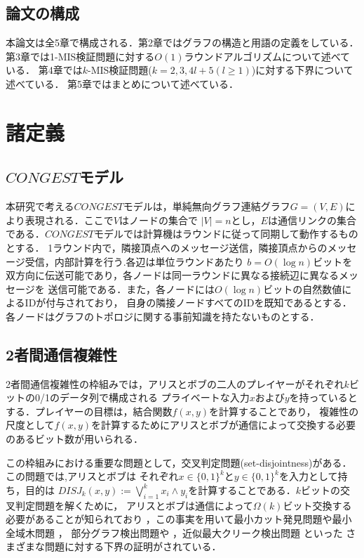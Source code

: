 \documentclass[12pt]{thesis}
\theoremstyle{definition}
\begin{document}
\section{論文の構成}
本論文は全5章で構成される．第2章ではグラフの構造と用語の定義をしている．
第3章では1-MIS検証問題に対する$O(1)$ラウンドアルゴリズムについて述べている．
第4章では$k$-MIS検証問題($k = 2, 3, 4l + 5 ( l \geq 1)$)に対する下界について述べている．
第5章ではまとめについて述べている．

\chapter{諸定義}

\section{$CONGEST$モデル}
本研究で考える$CONGEST$モデルは，単純無向グラフ連結グラフ$G = (V, E)$により表現される．ここで$V$はノードの集合で
$|V| = n$とし，$E$は通信リンクの集合である．$CONGEST$モデルでは計算機はラウンドに従って同期して動作するものとする．
1ラウンド内で，隣接頂点へのメッセージ送信，隣接頂点からのメッセージ受信，内部計算を行う.各辺は単位ラウンドあたり
$b = O(\log n)$ビットを双方向に伝送可能であり，各ノードは同一ラウンドに異なる接続辺に異なるメッセージを
送信可能である．また，各ノードには$O(\log n)$ビットの自然数値によるIDが付与されており，
自身の隣接ノードすべてのIDを既知であるとする．各ノードはグラフのトポロジに関する事前知識を持たないものとする．

\section{2者間通信複雑性}
2者間通信複雑性の枠組みでは，アリスとボブの二人のプレイヤーがそれぞれ$k$ビットの0/1のデータ列で構成される
プライベートな入力$x$および$y$を持っているとする．プレイヤーの目標は，結合関数$f(x, y)$を計算することであり，
複雑性の尺度として$f(x, y)$を計算するためにアリスとボブが通信によって交換する必要のあるビット数が用いられる．

この枠組みにおける重要な問題として，交叉判定問題(set-disjointness)がある．この問題では,アリスとボブは
それぞれ$x \in \{0, 1\}^{k}$と$y \in \{0, 1\}^{k}$を入力として持ち，目的は
$DISJ_{k} (x, y) :=\bigvee_{i = 1}^{k} x_{i} \land y_{i}$を計算することである．$k$ビットの交叉判定問題を解くために，
アリスとボブは通信によって$\Omega (k)$ビット交換する必要があることが知られており 
\cite{kalyanasundaram1992probabilistic}，この事実を用いて最小カット発見問題や最小全域木問題 \cite{sarma2012distributed}，
部分グラフ検出問題や \cite{fischer2018possibilities} ，近似最大クリーク検出問題 \cite{czumaj2020detecting} といった
さまざまな問題に対する下界の証明がされている．
\end{document}
